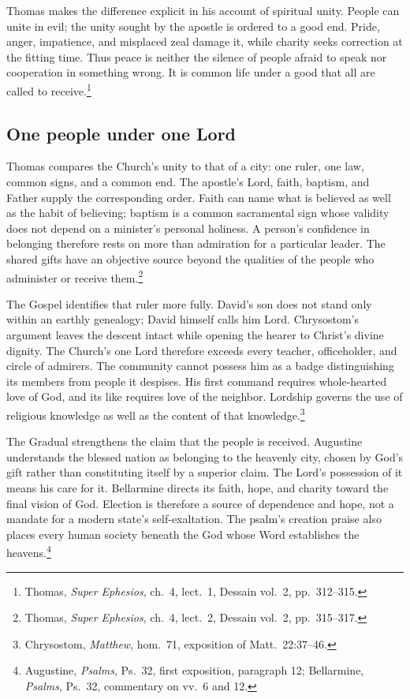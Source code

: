 Thomas makes the difference explicit in his account of spiritual unity. People can unite in evil; the unity sought by the apostle is ordered to a good end. Pride, anger, impatience, and misplaced zeal damage it, while charity seeks correction at the fitting time. Thus peace is neither the silence of people afraid to speak nor cooperation in something wrong. It is common life under a good that all are called to receive.\footnote{Thomas, \textit{Super Ephesios}, ch.~4, lect.~1, Dessain vol.~2, pp.~312--315.}

\subsection{One people under one Lord}
Thomas compares the Church's unity to that of a city: one ruler, one law, common signs, and a common end. The apostle's Lord, faith, baptism, and Father supply the corresponding order. Faith can name what is believed as well as the habit of believing; baptism is a common sacramental sign whose validity does not depend on a minister's personal holiness. A person's confidence in belonging therefore rests on more than admiration for a particular leader. The shared gifts have an objective source beyond the qualities of the people who administer or receive them.\footnote{Thomas, \textit{Super Ephesios}, ch.~4, lect.~2, Dessain vol.~2, pp.~315--317.}

The Gospel identifies that ruler more fully. David's son does not stand only within an earthly genealogy; David himself calls him Lord. Chrysostom's argument leaves the descent intact while opening the hearer to Christ's divine dignity. The Church's one Lord therefore exceeds every teacher, officeholder, and circle of admirers. The community cannot possess him as a badge distinguishing its members from people it despises. His first command requires whole-hearted love of God, and its like requires love of the neighbor. Lordship governs the use of religious knowledge as well as the content of that knowledge.\footnote{Chrysostom, \textit{Matthew}, hom.~71, exposition of Matt.~22:37--46.}

The Gradual strengthens the claim that the people is received. Augustine understands the blessed nation as belonging to the heavenly city, chosen by God's gift rather than constituting itself by a superior claim. The Lord's possession of it means his care for it. Bellarmine directs its faith, hope, and charity toward the final vision of God. Election is therefore a source of dependence and hope, not a mandate for a modern state's self-exaltation. The psalm's creation praise also places every human society beneath the God whose Word establishes the heavens.\footnote{Augustine, \textit{Psalms}, Ps.~32, first exposition, paragraph 12; Bellarmine, \textit{Psalms}, Ps.~32, commentary on vv.~6 and 12.}

